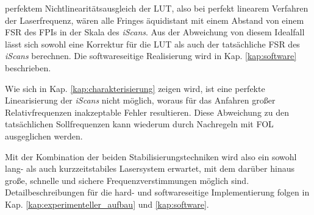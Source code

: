 perfektem Nichtlinearitätsausgleich der LUT, also bei perfekt linearem
Verfahren der Laserfrequenz, wären alle Fringes äquidistant mit einem Abstand
von einem FSR des FPIs in der Skala des \textit{iScans}. Aus der Abweichung von
diesem Idealfall lässt sich sowohl eine Korrektur für die LUT als auch der tatsächliche
FSR des \textit{iScans} berechnen. Die softwareseitige Realisierung wird in Kap.
\ref{kap:software} beschrieben.\par
Wie sich in Kap. \ref{kap:charakterisierung} zeigen wird, ist eine perfekte
Linearisierung der \textit{iScans} nicht möglich, woraus für das Anfahren großer
Relativfrequenzen inakzeptable Fehler resultieren. Diese Abweichung zu den
tatsächlichen Sollfrequenzen kann wiederum durch Nachregeln mit
FOL ausgeglichen werden.\par
Mit der Kombination der beiden Stabilisierungstechniken wird also ein sowohl
lang- als auch kurzzeitstabiles Lasersystem erwartet, mit dem darüber hinaus große, schnelle und sichere Frequenzverstimmungen möglich sind.
Detailbeschreibungen für die hard- und softwareseitige Implementierung folgen in
Kap. \ref{kap:experimenteller_aufbau} und \ref{kap:software}.